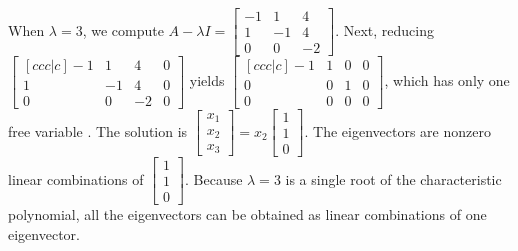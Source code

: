 \begin{example}
When $\lambda=3$, we compute $A-\lambda I =\begin{bmatrix}-1&1&4\\ 1&-1&4\\ 0&0&-2\end{bmatrix}$. Next, reducing $\begin{bmatrix}[ccc|c]-1&1&4&0\\ 1&-1&4&0\\ 0&0&-2&0\end{bmatrix}$ yields $\begin{bmatrix}[ccc|c]-1&1&0&0\\ 0&0&1&0\\ 0&0&0&0\end{bmatrix} $, which has only one free variable . The solution is $\begin{bmatrix} x_1\\x_2\\ x_3\end{bmatrix} = x_2\begin{bmatrix} 1\\1\\0\end{bmatrix}$. The eigenvectors are nonzero linear combinations of $\begin{bmatrix} 1\\1\\0\end{bmatrix}$. Because $\lambda=3$ is a single root of the characteristic polynomial, all the eigenvectors can be obtained as linear combinations of one eigenvector.
\end{example}

